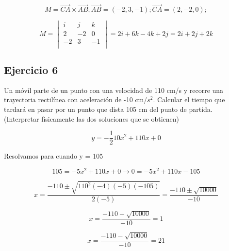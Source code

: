 $$
M = \overrightarrow{CA} \times \overrightarrow{AB};
\overrightarrow{AB} = (-2, 3, -1);
\overrightarrow{CA} = (2, -2, 0);
$$

$$
M = 
\begin{vmatrix}
  i & j & k \\
  2 &-2 & 0 \\
 -2 & 3 &-1 \\
\end{vmatrix}
= 2i + 6k -4k +2j
= 2i + 2j + 2k
$$

\subsection{Ejercicio 6}
Un móvil parte de un punto con una velocidad de
110 cm/s y recorre una trayectoria rectilínea
con aceleración de -10 cm/$s^2$. Calcular el
tiempo que tardará en pasar por un punto
que dista 105 cm del punto de partida.
(Interpretar físicamente las dos soluciones
que se obtienen)

$$
y = -\frac{1}{2}10x^2 + 110x + 0
$$

Resolvamos para cuando y = 105

$$
105 = -5x^2 + 110x + 0 \rightarrow
0 = -5x^2 + 110x - 105
$$

$$
x = \frac{-110 \pm \sqrt{110^2 (-4)(-5)(-105)}}{2(-5)}
= \frac{-110 \pm \sqrt{10000}}{-10}
$$

$$
x = \frac{-110 + \sqrt{10000}}{-10} = 1
$$

$$
x = \frac{-110 - \sqrt{10000}}{-10} = 21
$$